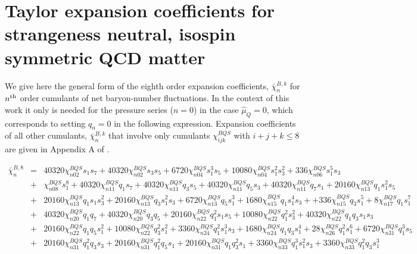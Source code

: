 \documentclass[pdflatex,prd,twocolumn,showpacs,superscriptaddress,nofootinbib]{revtex4-1}
\newcommand \hmu {\hat{\mu}}
\newcommand \cb {\bar{\chi}}
\begin{document}
\section{Taylor expansion coefficients for strangeness neutral, isospin symmetric QCD matter}
\label{app:Pn}
We give here the general form of the eighth order
expansion coefficients, $\cb_n^{B,k}$ for $n^{\rm th}$
order cumulants of net baryon-number fluctuations.
In the context of this work it only is needed for
the pressure series ($n=0$) in the case $\hmu_Q = 0$, which corresponds to setting $q_n=0$ in the following expression.
Expansion coefficients of all other cumulants, $\cb_n^{B,k}$ that involve only cumulants $\chi_{ijk}^{BQS}$ with $i+j+k\le 8$ are given in Appendix A of \cite{Bazavov:2020bjn}.
\begin{widetext}
\begin{eqnarray}
\bar{\chi}^{B,8}_n&=& 40320 \chi^{BQS}_{n02} s_{1} s_{7} + 40320 \chi^{BQS}_{n02} s_{3} s_{5} + 6720  \chi^{BQS}_{n04} s_{1}^{3} s_{5} +  10080 \chi^{BQS}_{n04} s_{1}^{2} s_{3}^{2}  + 336 \chi^{BQS}_{n06} s_{1}^{5} s_{3} \nonumber \\
&+&  \chi^{BQS}_{n08} s_{1}^{8}
 + 40320 \chi^{BQS}_{n11} q_{1} s_{7} + 40320 \chi^{BQS}_{n11} q_{3} s_{5} + 40320 \chi^{BQS}_{n11} q_{5} s_{3}
 + 40320 \chi^{BQS}_{n11} q_{7} s_{1} + 20160 \chi^{BQS}_{n13} q_{1} s_{1}^{2} s_{5} \nonumber \\
 &+& 20160 \chi^{BQS}_{n13} q_{1} s_{1} s_{3}^{2} 
 + 20160 \chi^{BQS}_{n13} q_{3} s_{1}^{2} s_{3} + 6720 \chi^{BQS}_{n13} q_{5} s_{1}^{3} + 1680 \chi^{BQS}_{n15} q_{1} s_{1}^{4} s_{3} + 
 + 336 \chi^{BQS}_{n15} q_{3} s_{1}^{5} + 8 \chi^{BQS}_{n17} q_{1} s_{1}^{7} \nonumber \\
 &+& 40320 \chi^{BQS}_{n20} q_{1} q_{7}
 + 40320 \chi^{BQS}_{n20} q_{3} q_{5} + 20160 \chi^{BQS}_{n22} q_{1}^{2} s_{1} s_{5} + 10080 \chi^{BQS}_{n22} q_{1}^{2} s_{3}^{2} 
 + 40320 \chi^{BQS}_{n22} q_{1} q_{3} s_{1} s_{3} \nonumber \\
 &+& 20160 \chi^{BQS}_{n22} q_{1} q_{5} s_{1}^{2} + 10080 \chi^{BQS}_{n22} q_{3}^{2} s_{1}^{2} 
 + 3360 \chi^{BQS}_{n24} q_{1}^{2} s_{1}^{3} s_{3} + 1680 \chi^{BQS}_{n24} q_{1} q_{3} s_{1}^{4} + 28 \chi^{BQS}_{n26} q_{1}^{2} s_{1}^{6} 
 + 6720 \chi^{BQS}_{n31} q_{1}^{3} s_{5} \nonumber \\
 &+& 20160 \chi^{BQS}_{n31} q_{1}^{2} q_{3} s_{3} + 20160 \chi^{BQS}_{n31} q_{1}^{2} q_{5} s_{1}
 + 20160 \chi^{BQS}_{n31} q_{1} q_{3}^{2} s_{1} + 3360 \chi^{BQS}_{n33} q_{1}^{3} s_{1}^{2} s_{3} + 3360 \chi^{BQS}_{n33} q_{1}^{2} q_{3} s_{1}^{3} \nonumber \\

\end{eqnarray}
\end{widetext}
\end{document}
